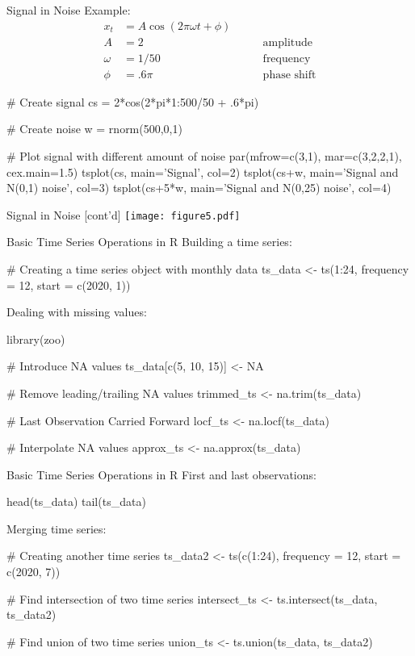 \documentclass[ignorenonframetext,xcolor=x11names]{beamer}
\begin{document}
\begin{frame}[fragile]{Signal in Noise}
Example:
\begin{align*}
x_t &= A \cos (2 \pi \omega t + \phi) \\
A &= 2 &\qquad \text{amplitude} \\
\omega &= 1/50 &\qquad \text{frequency} \\
\phi &= .6 \pi &\qquad \text{phase shift}
\end{align*}

\vspace{-1.5\baselineskip}
\begin{Rcode}
# Create signal
cs = 2*cos(2*pi*1:500/50 + .6*pi)

# Create noise
w = rnorm(500,0,1)

# Plot signal with different amount of noise
par(mfrow=c(3,1), mar=c(3,2,2,1), cex.main=1.5)
tsplot(cs, main='Signal', col=2)
tsplot(cs+w, main='Signal and N(0,1) noise', col=3)
tsplot(cs+5*w, main='Signal and N(0,25) noise', col=4)
\end{Rcode}
\end{frame}

\begin{frame}{Signal in Noise \small [cont'd]}
\centering
\texttt{[image: figure5.pdf]}
\end{frame}

\begin{frame}[fragile]{Basic Time Series Operations in R}
Building a time series:
\begin{Rcode}
# Creating a time series object with monthly data
ts_data <- ts(1:24, frequency = 12, start = c(2020, 1))
\end{Rcode}
Dealing with missing values:
\begin{Rcode}
library(zoo)

# Introduce NA values
ts_data[c(5, 10, 15)] <- NA

# Remove leading/trailing NA values
trimmed_ts <- na.trim(ts_data)

# Last Observation Carried Forward
locf_ts <- na.locf(ts_data)

# Interpolate NA values
approx_ts <- na.approx(ts_data)
\end{Rcode}
\end{frame}

\begin{frame}[fragile]{Basic Time Series Operations in R}
First and last observations:
\begin{Rcode}
head(ts_data)
tail(ts_data)
\end{Rcode}
Merging time series:
\begin{Rcode}
# Creating another time series
ts_data2 <- ts(c(1:24), frequency = 12, start = c(2020, 7))

# Find intersection of two time series
intersect_ts <- ts.intersect(ts_data, ts_data2)

# Find union of two time series
union_ts <- ts.union(ts_data, ts_data2)
\end{Rcode}
\end{frame}
\end{document}
